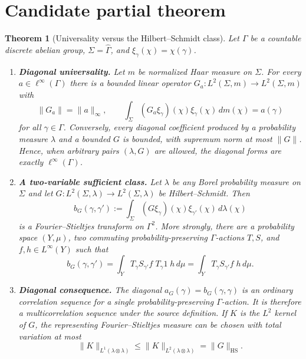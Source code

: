 \documentclass[11pt]{article}
\newtheorem{theorem}{Theorem}
\newcommand{\HS}{\mathrm{HS}}
\begin{document}
\section{Candidate partial theorem}

\begin{theorem}[Universality versus the Hilbert--Schmidt class]\label{thm:main}
Let $\Gamma$ be a countable discrete abelian group,
$\Sigma=\widehat\Gamma$, and $\xi_\gamma(\chi)=\chi(\gamma)$.
\begin{enumerate}[label=\textup{(\alph*)}]
\item \textbf{Diagonal universality.}
Let $m$ be normalized Haar measure on $\Sigma$.  For every
$a\in\ell^\infty(\Gamma)$ there is a bounded linear operator
$G_a:L^2(\Sigma,m)\to L^2(\Sigma,m)$ with
\[
 \|G_a\|=\|a\|_\infty,
 \qquad
 \int_\Sigma (G_a\xi_\gamma)(\chi)\xi_\gamma(\chi)\,dm(\chi)
 =a(\gamma)
\]
for all $\gamma\in\Gamma$.  Conversely, every diagonal coefficient produced
by a probability measure $\lambda$ and a bounded $G$ is bounded, with
supremum norm at most $\|G\|$.  Hence, when arbitrary pairs $(\lambda,G)$ are
allowed, the diagonal forms are exactly $\ell^\infty(\Gamma)$.

\item \textbf{A two-variable sufficient class.}
Let $\lambda$ be any Borel probability measure on $\Sigma$ and let
$G:L^2(\Sigma,\lambda)\to L^2(\Sigma,\lambda)$ be Hilbert--Schmidt.  Then
\[
 b_G(\gamma,\gamma')
 :=\int_\Sigma (G\xi_\gamma)(\chi)\xi_{\gamma'}(\chi)\,d\lambda(\chi)
\]
is a Fourier--Stieltjes transform on $\Gamma^2$.  More strongly, there are a
probability space $(Y,\mu)$, two commuting probability-preserving
$\Gamma$-actions $T,S$, and $f,h\in L^\infty(Y)$ such that
\[
 b_G(\gamma,\gamma')
 =\int_Y T_\gamma S_{\gamma'}f\;T_\gamma 1\;h\,d\mu
 =\int_Y T_\gamma S_{\gamma'}f\;h\,d\mu.
\]

\item \textbf{Diagonal consequence.}
The diagonal $a_G(\gamma)=b_G(\gamma,\gamma)$ is an ordinary correlation
sequence for a single probability-preserving $\Gamma$-action.  It is therefore
a multicorrelation sequence under the source definition.  If $K$ is the
$L^2$ kernel of $G$, the representing Fourier--Stieltjes measure can be chosen
with total variation at most
\[
 \|K\|_{L^1(\lambda\otimes\lambda)}
 \leq \|K\|_{L^2(\lambda\otimes\lambda)}=\|G\|_{\HS}.
\]
\end{enumerate}
\end{theorem}
\end{document}

